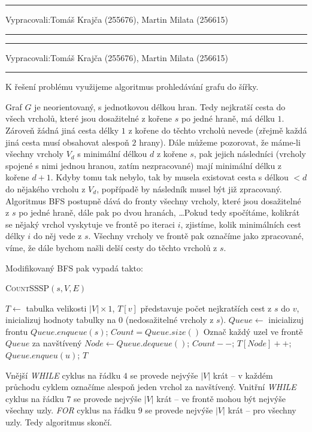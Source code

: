 \documentclass[12pt]{article}
\newcommand{\la}{\leftarrow}
\newcommand{\zadani}[2]{
{\large
\noindent {\bf IB108 \hfill{} Sada #1, Příklad #2 \\[-4mm]}
\noindent\hrule
\vspace{2mm}
\noindent Vypracovali:\hfill{}Tomáš Krajča (255676), Martin Milata (256615)
\vspace{3mm}
\hrule
\bigskip\bigskip}
}
\begin{document}
\zadani{3}{1}

\clearpage
\zadani{3}{2}

\noindent
K řešení problému využijeme algoritmus prohledávání grafu do šířky.

\noindent
Graf $G$ je neorientovaný, s jednotkovou délkou hran. Tedy nejkratší cesta do všech vrcholů, které
jsou dosažitelné z kořene $s$ po jedné hraně, má délku $1$. Zároveň žádná jiná
cesta délky $1$ z kořene do těchto vrcholů nevede (zřejmě každá jiná cesta musí
obsahovat alespoň $2$ hrany). Dále můžeme pozorovat, že máme-li všechny vrcholy
$V_d$ s
minimální délkou $d$ z kořene $s$, pak jejich následníci (vrcholy spojené s nimi
jednou hranou, zatím nezpracované) mají minimální délku z kořene $d+1$. Kdyby
tomu
tak nebylo, tak by musela existovat cesta s délkou $<d$ do nějakého
vrcholu z $V_d$, popřípadě by následník musel být již zpracovaný.\\
Algoritmus \textsc{BFS} postupně dává do fronty všechny vrcholy, které jsou
dosažitelné z $s$ po jedné hraně, dále pak po dvou hranách, \dots Pokud tedy
spočítáme, kolikrát se nějaký vrchol vyskytuje ve frontě po iteraci $i$,
zjistíme, kolik minimálních cest délky $i$ do něj vede z $s$. Všechny
vrcholy ve frontě pak označíme jako zpracované, víme, že dále bychom našli delší
cesty do těchto vrcholů z $s$.

\noindent
Modifikovaný \textsc{BFS} pak vypadá takto:
\begin{algorithm}
\textsc{CountSSSP}$(s, V, E)$
\begin{algorithmic}[1]
\STATE $T \la$ tabulka velikosti $|V| \times 1$, $T[v]$ představuje počet
nejkratších cest z $s$ do $v$, inicializuj hodnoty tabulky na $0$ (nedosažitelné
vrcholy z $s$).
\STATE $Queue \la$ inicializuj frontu
\STATE $Queue.enqueue(s)$;
\STATE $Count = Queue.size()$
\STATE Označ každý uzel ve frontě $Queue$ za navštívený
\STATE $Node \la Queue.dequeue()$; $Count--$; $T[Node]++$;
\STATE $Queue.enqueu(u)$;
\ENDFOR
\ENDWHILE
\ENDWHILE
\RETURN $T$
\end{algorithmic}
\end{algorithm}

\noindent
Vnější \textit{WHILE} cyklus na řádku $4$ se provede nejvýše $|V|$ krát -- v
každém průchodu cyklem označíme alespoň jeden vrchol za navštívený. Vnitřní
\textit{WHILE} cyklus na řádku $7$ se provede nejvýše $|V|$ krát -- ve frontě
mohou být nejvýše všechny uzly. \textit{FOR} cyklus na řádku $9$ se provede
nejvýše $|V|$ krát -- pro všechny uzly. Tedy algoritmus skončí.
\end{document}
